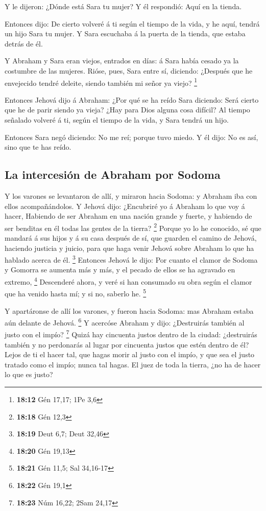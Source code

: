  Y le dijeron: ¿Dónde está Sara tu mujer? Y él respondió:
Aquí en la tienda.

 Entonces dijo: De cierto volveré á ti según el tiempo de
la vida, y he aquí, tendrá un hijo Sara tu mujer. Y Sara escuchaba á la
puerta de la tienda, que estaba detrás de él.

 Y Abraham y Sara eran viejos, entrados en días: á Sara
había cesado ya la costumbre de las mujeres.  Rióse,
pues, Sara entre sí, diciendo: ¿Después que he envejecido tendré
deleite, siendo también mi señor ya viejo? \footnote{\textbf{18:12} Gén
  17,17; 1Pe 3,6}

 Entonces Jehová dijo á Abraham: ¿Por qué se ha reído
Sara diciendo: Será cierto que he de parir siendo ya vieja?
 ¿Hay para Dios alguna cosa difícil? Al tiempo señalado
volveré á ti, según el tiempo de la vida, y Sara tendrá un hijo.

 Entonces Sara negó diciendo: No me reí; porque tuvo
miedo. Y él dijo: No es así, sino que te has reído.

\hypertarget{la-intercesiuxf3n-de-abraham-por-sodoma}{%
\subsection{La intercesión de Abraham por
Sodoma}\label{la-intercesiuxf3n-de-abraham-por-sodoma}}

 Y los varones se levantaron de allí, y miraron hacia
Sodoma: y Abraham iba con ellos acompañándolos.  Y Jehová
dijo: ¿Encubriré yo á Abraham lo que voy á hacer, 
Habiendo de ser Abraham en una nación grande y fuerte, y habiendo de ser
benditas en él todas las gentes de la tierra? \footnote{\textbf{18:18}
  Gén 12,3}  Porque yo lo he conocido, sé que mandará á
sus hijos y á su casa después de sí, que guarden el camino de Jehová,
haciendo justicia y juicio, para que haga venir Jehová sobre Abraham lo
que ha hablado acerca de él. \footnote{\textbf{18:19} Deut 6,7; Deut
  32,46}  Entonces Jehová le dijo: Por cuanto el clamor
de Sodoma y Gomorra se aumenta más y más, y el pecado de ellos se ha
agravado en extremo, \footnote{\textbf{18:20} Gén 19,13} 
Descenderé ahora, y veré si han consumado su obra según el clamor que ha
venido hasta mí; y si no, saberlo he. \footnote{\textbf{18:21} Gén 11,5;
  Sal 34,16-17}

 Y apartáronse de allí los varones, y fueron hacia
Sodoma: mas Abraham estaba aún delante de Jehová. \footnote{\textbf{18:22}
  Gén 19,1}  Y acercóse Abraham y dijo: ¿Destruirás
también al justo con el impío? \footnote{\textbf{18:23} Núm 16,22; 2Sam
  24,17}  Quizá hay cincuenta justos dentro de la ciudad:
¿destruirás también y no perdonarás al lugar por cincuenta justos que
estén dentro de él?  Lejos de ti el hacer tal, que hagas
morir al justo con el impío, y que sea el justo tratado como el impío;
nunca tal hagas. El juez de toda la tierra, ¿no ha de hacer lo que es
justo?

